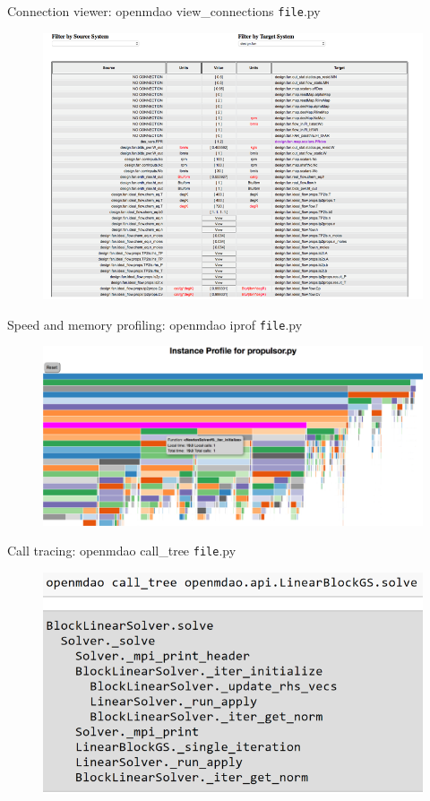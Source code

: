 \documentclass[aspectratio=169, usenames,dvipsnames, 14pt]{beamer}
\begin{document}
\begin{frame}{Connection viewer: openmdao view\_connections \texttt{file}.py}
	\begin{figure}
		\includegraphics[scale=.425]{images/slide_127.png}
	\end{figure}
\end{frame}

\begin{frame}{Speed and memory profiling: openmdao iprof \texttt{file}.py}
	\begin{figure}
		\includegraphics[scale=.4]{images/slide_128.png}
	\end{figure}
\end{frame}

\begin{frame}{Call tracing: openmdao call\_tree \texttt{file}.py}
	\begin{figure}
		\includegraphics[scale=.6]{images/slide_129.png}
	\end{figure}
\end{frame}
\end{document}
